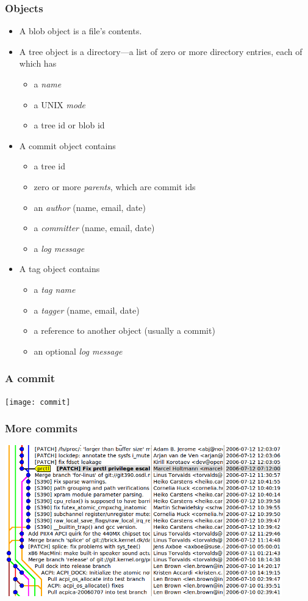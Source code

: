 \documentclass{beamer}
\begin{document}
\begin{frame}
  \frametitle{Objects}

  \begin{itemize}
  \item A blob object is a file's contents.
  \item A tree object is a directory---a list of zero or more
    directory entries, each of which has
    \begin{itemize}
    \item a \emph{name}
    \item a UNIX \emph{mode}
    \item a tree id or blob id
    \end{itemize}
  \item A commit object contains
    \begin{itemize}
    \item a tree id
    \item zero or more \emph{parents}, which are commit ids
    \item an \emph{author} (name, email, date)
    \item a \emph{committer} (name, email, date)
    \item a \emph{log message}
    \end{itemize}
  \item A tag object contains
    \begin{itemize}
    \item a \emph{tag name}
    \item a \emph{tagger} (name, email, date)
    \item a reference to another object (usually a commit)
    \item an optional \emph{log message}
    \end{itemize}
  \end{itemize}
\end{frame}

\begin{frame}
  \frametitle{A commit}
  \hspace*{-0.5cm}\texttt{[image: commit]}
\end{frame}

\begin{frame}
  \frametitle{More commits}
  \hspace*{-0.5cm}\includegraphics[width=12cm]{prctl}
\end{frame}
\end{document}
